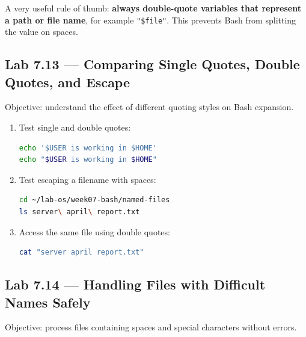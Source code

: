 \begin{tipbox}
A very useful rule of thumb: \textbf{always double-quote variables that
represent a path or file name}, for example \texttt{"\$file"}. This prevents
Bash from splitting the value on spaces.
\end{tipbox}

\subsection*{Lab 7.13 --- Comparing Single Quotes, Double Quotes, and Escape}

Objective: understand the effect of different quoting styles on Bash
expansion.

\begin{enumerate}
  \item Test single and double quotes:
\begin{lstlisting}[language=bash, caption={Testing the difference between quote types}]
echo '$USER is working in $HOME'
echo "$USER is working in $HOME"
\end{lstlisting}

  \item Test escaping a filename with spaces:
\begin{lstlisting}[language=bash, caption={Using escape on a path with spaces}]
cd ~/lab-os/week07-bash/named-files
ls server\ april\ report.txt
\end{lstlisting}

  \item Access the same file using double quotes:
\begin{lstlisting}[language=bash, caption={Using double quotes on a path with spaces}]
cat "server april report.txt"
\end{lstlisting}
\end{enumerate}

\subsection*{Lab 7.14 --- Handling Files with Difficult Names Safely}

Objective: process files containing spaces and special characters without
errors.


